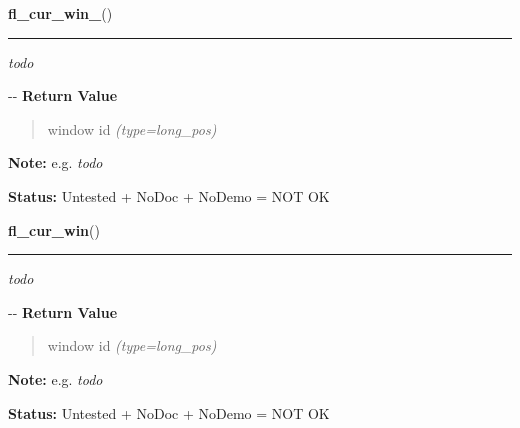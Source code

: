     \label{xformslib:flmisc:fl_cur_win_}

    \vspace{0.5ex}

\hspace{.8\funcindent}\begin{boxedminipage}{\funcwidth}

    \raggedright \textbf{fl\_cur\_win\_}()

    \vspace{-1.5ex}

    \rule{\textwidth}{0.5\fboxrule}
\setlength{\parskip}{2ex}

\emph{todo}

-{}-
\setlength{\parskip}{1ex}
      \textbf{Return Value}
    \vspace{-1ex}

      \begin{quote}

window id
      {\it (type=long\_pos)}

      \end{quote}

\textbf{Note:} 
e.g. \emph{todo}


\textbf{Status:} 
Untested + NoDoc + NoDemo = NOT OK


    \end{boxedminipage}

    \label{xformslib:flmisc:fl_cur_win_}

    \vspace{0.5ex}

\hspace{.8\funcindent}\begin{boxedminipage}{\funcwidth}

    \raggedright \textbf{fl\_cur\_win}()

    \vspace{-1.5ex}

    \rule{\textwidth}{0.5\fboxrule}
\setlength{\parskip}{2ex}

\emph{todo}

-{}-
\setlength{\parskip}{1ex}
      \textbf{Return Value}
    \vspace{-1ex}

      \begin{quote}

window id
      {\it (type=long\_pos)}

      \end{quote}

\textbf{Note:} 
e.g. \emph{todo}


\textbf{Status:} 
Untested + NoDoc + NoDemo = NOT OK


    \end{boxedminipage}


